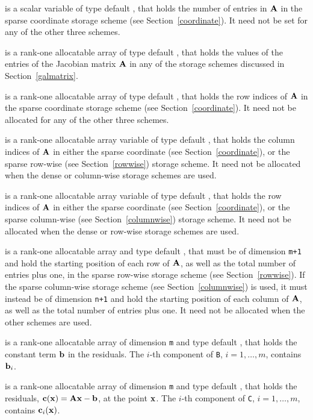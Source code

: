 \documentclass{galahad}
\begin{document}
\begin{description}
\begin{description}
 is a scalar variable of type default \integer, that
holds the number of entries in ${\mathbf{A}}$
in the sparse coordinate storage scheme (see Section~\ref{coordinate}).
It need not be set for any of the other three schemes.

 is a rank-one allocatable array of type default \realdp, that holds
the values of the entries of the Jacobian matrix ${\mathbf{A}}$ in any of the
storage schemes discussed in Section~\ref{galmatrix}.

 is a rank-one allocatable array of type default \integer,
that holds the row indices of ${\mathbf{A}}$ in the sparse coordinate storage
scheme (see Section~\ref{coordinate}).
It need not be allocated for any of the other three schemes.

 is a rank-one allocatable array variable of type default \integer,
that holds the column indices of ${\mathbf{A}}$ in either the sparse coordinate
(see Section~\ref{coordinate}), or the sparse row-wise
(see Section~\ref{rowwise}) storage scheme.
It need not be allocated when the dense or column-wise storage schemes are used.

 is a rank-one allocatable array variable of type default \integer,
that holds the row indices of ${\mathbf{A}}$ in either the sparse coordinate
(see Section~\ref{coordinate}), or the sparse column-wise
(see Section~\ref{columnwise}) storage scheme.
It need not be allocated when the dense or row-wise storage schemes are used.

 is a rank-one allocatable array and type default \integer,
that must be of dimension {\tt m+1}
and hold the starting position of each row of ${\mathbf{A}}$, as well
as the total number of entries plus one, in the sparse row-wise storage
scheme (see Section~\ref{rowwise}).
If the sparse column-wise storage scheme (see Section~\ref{columnwise})
is used, it must instead be of dimension {\tt n+1}
and hold the starting position of each column of ${\mathbf{A}}$, as well
as the total number of entries plus one.
It need not be allocated when the
other schemes are used.

\end{description}

 is a rank-one allocatable array of dimension {\tt m} and type
default \realdp, that holds the constant term ${\mathbf{b}}$ in the residuals.
The $i$-th component of {\tt B}, $i = 1, \ldots, m$, contains ${\mathbf{b}}_{i}$.

 is a rank-one allocatable array of dimension {\tt m} and type
default \realdp, that holds the residuals, ${\mathbf{c}}({\mathbf{x}}) = {\mathbf{A}} {\mathbf{x}} - {\mathbf{b}}$,
at the point ${\mathbf{x}}$. The $i$-th component of
{\tt C}, $i = 1, \ldots, m$, contains ${\mathbf{c}}_{i}({\mathbf{x}})$.


\end{description}
\end{document}
